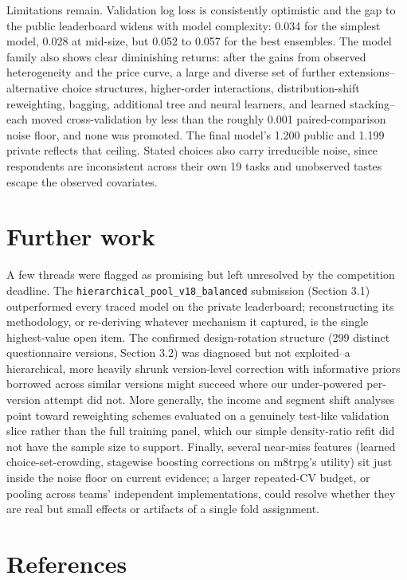 \documentclass[
  9.5pt,
]{article}
\newcounter{none} %
\begin{document}
Limitations remain. Validation log loss is consistently optimistic and
the gap to the public leaderboard widens with model complexity: 0.034
for the simplest model, 0.028 at mid-size, but 0.052 to 0.057 for the
best ensembles. The model family also shows clear diminishing returns:
after the gains from observed heterogeneity and the price curve, a large
and diverse set of further extensions--alternative choice structures,
higher-order interactions, distribution-shift reweighting, bagging,
additional tree and neural learners, and learned stacking--each moved
cross-validation by less than the roughly 0.001 paired-comparison noise
floor, and none was promoted. The final model's 1.200 public and 1.199
private reflects that ceiling. Stated choices also carry irreducible
noise, since respondents are inconsistent across their own 19 tasks and
unobserved tastes escape the observed covariates.

\section{Further work}\label{further-work}

A few threads were flagged as promising but left unresolved by the
competition deadline. The \texttt{hierarchical\_pool\_v18\_balanced}
submission (Section 3.1) outperformed every traced model on the private
leaderboard; reconstructing its methodology, or re-deriving whatever
mechanism it captured, is the single highest-value open item. The
confirmed design-rotation structure (299 distinct questionnaire
versions, Section 3.2) was diagnosed but not exploited--a hierarchical,
more heavily shrunk version-level correction with informative priors
borrowed across similar versions might succeed where our under-powered
per-version attempt did not. More generally, the income and segment
shift analyses point toward reweighting schemes evaluated on a genuinely
test-like validation slice rather than the full training panel, which
our simple density-ratio refit did not have the sample size to support.
Finally, several near-miss features (learned choice-set-crowding,
stagewise boosting corrections on m8trpg's utility) sit just inside the
noise floor on current evidence; a larger repeated-CV budget, or pooling
across teams' independent implementations, could resolve whether they
are real but small effects or artifacts of a single fold assignment.

\section*{References}\label{references}
\end{document}
